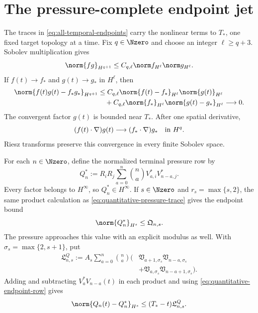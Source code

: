 \section{The pressure-complete endpoint jet}
\label{sec:endpoint-jet}

The traces in \eqref{eq:all-temporal-endpoints} carry the nonlinear terms to
\(T_*\), one fixed target topology at a time.  Fix \(q\in\Nzero\) and choose
an integer \(\ell\ge q+3\).  Sobolev
multiplication gives
\[
 \norm{fg}_{H^{q+1}}
 \le C_{q,\ell}\norm f_{H^\ell}\norm g_{H^\ell}.
\]
If \(f(t)\to f_*\) and \(g(t)\to g_*\) in \(H^\ell\), then
\begin{align*}
 \norm{f(t)g(t)-f_*g_*}_{H^{q+1}}
 &\le C_{q,\ell}
 \norm{f(t)-f_*}_{H^\ell}\norm{g(t)}_{H^\ell}\\
 &\quad+C_{q,\ell}
 \norm{f_*}_{H^\ell}\norm{g(t)-g_*}_{H^\ell}
 \longrightarrow0.
\end{align*}
The convergent factor \(g(t)\) is bounded near \(T_*\).  After one spatial
derivative,
\[
 (f(t)\cdot\nabla)g(t)
 \longrightarrow(f_*\cdot\nabla)g_*
 \quad\hbox{in }H^q.
\]
Riesz transforms preserve this convergence in every finite Sobolev space.

For each \(n\in\Nzero\), define the normalized terminal pressure row by
\begin{equation}
 Q_n^*
 :=R_iR_j\sum_{a=0}^{n}\binom na
 V_{a,i}^*V_{n-a,j}^*.
 \label{eq:endpoint-pressure}
\end{equation}
Every factor belongs to \(H^\infty\), so \(Q_n^*\in H^\infty\).
If \(s\in\Nzero\) and \(r_s=\max\{s,2\}\), the same product calculation as
\eqref{eq:quantitative-pressure-trace} gives the endpoint bound
\begin{equation}
 \norm{Q_n^*}_{H^s}
 \le\mathfrak Q_{n,s}.
 \label{eq:quantitative-endpoint-pressure}
\end{equation}
The pressure approaches this value with an explicit modulus as well.  With
\(\sigma_s=\max\{2,s+1\}\), put
\begin{equation}
 \begin{aligned}
 \mathfrak L^Q_{n,s}
 :=A_s\sum_{a=0}^{n}\binom na
 \bigl(&
 \mathfrak V_{a+1,\sigma_s}\mathfrak V_{n-a,\sigma_s}\\
 &+\mathfrak V_{a,\sigma_s}
   \mathfrak V_{n-a+1,\sigma_s}
 \bigr).
 \end{aligned}
 \label{eq:pressure-endpoint-modulus-constant}
\end{equation}
Adding and subtracting
\(V_a^*V_{n-a}(t)\) in each product and using
\eqref{eq:quantitative-endpoint-row} gives
\begin{equation}
 \norm{Q_n(t)-Q_n^*}_{H^s}
 \le(T_*-t)\mathfrak L^Q_{n,s}.
 \label{eq:quantitative-pressure-endpoint-modulus}
\end{equation}

